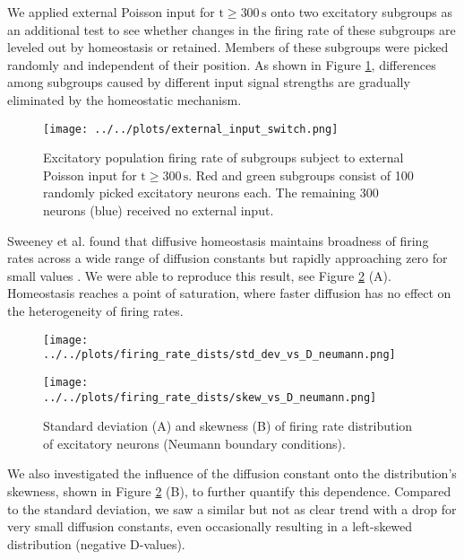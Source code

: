 \documentclass[10pt,a4paper]{article}
\begin{document}
We applied external Poisson input for $\mathrm{t\geq 300\, s}$ onto two excitatory subgroups as an additional test to see whether changes in the firing rate of these subgroups are leveled out by homeostasis or retained. Members of these subgroups were picked randomly and independent of their position. As shown in Figure \ref{Ext_Input_Switch}, differences among subgroups caused by different input signal strengths are gradually eliminated by the homeostatic mechanism.
\begin{figure}
\begin{center}
\texttt{[image: ../../plots/external\_input\_switch.png]}
\end{center}
\caption{Excitatory population firing rate of subgroups subject to external Poisson input for $\mathrm{t\geq 300\, s}$. Red and green subgroups consist of 100 randomly picked excitatory neurons each. The remaining 300 neurons (blue) received no external input.}
\label{Ext_Input_Switch}
\end{figure}

Sweeney et al. found that diffusive homeostasis maintains broadness of firing rates across a wide range of diffusion constants but rapidly approaching zero for small values \cite[p. 6]{Sweeney_Paper}. We were able to reproduce this result, see Figure \ref{Fir_Rate_Dist_Width_Skewness_vs_D} (A). Homeostasis reaches a point of saturation, where faster diffusion has no effect on the heterogeneity of firing rates. 
\begin{figure}
\begin{minipage}{0.5\textwidth}
\texttt{[image: ../../plots/firing\_rate\_dists/std\_dev\_vs\_D\_neumann.png]}
\end{minipage}
\begin{minipage}{0.5\textwidth}
\texttt{[image: ../../plots/firing\_rate\_dists/skew\_vs\_D\_neumann.png]}
\end{minipage}
\caption{Standard deviation (A) and skewness (B) of firing rate distribution of excitatory neurons (Neumann boundary conditions).}
\label{Fir_Rate_Dist_Width_Skewness_vs_D}
\end{figure}
We also investigated the influence of the diffusion constant onto the distribution's skewness, shown in Figure \ref{Fir_Rate_Dist_Width_Skewness_vs_D} (B), to further quantify this dependence. Compared to the standard deviation, we saw a similar but not as clear trend with a drop for very small diffusion constants, even occasionally resulting in a left-skewed distribution (negative D-values).
\end{document}
